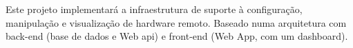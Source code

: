 \documentclass[report,a4paper,openright,twoside,11pt]{report}
\begin{document}
Este projeto implementará a infraestrutura de suporte à configuração, manipulação e visualização de hardware remoto. 
Baseado numa arquitetura com back-end (base de dados e Web \acs{api}) e front-end (Web App, com um dashboard).



\tableofcontents 

\cleardoublepage
{}
{}
\listoffigures

\cleardoublepage
{}
{}
\lstlistoflistings

\cleardoublepage
{}
{}
\printacronyms

\setcounter{page}{1}








%

%




%
\end{document}
